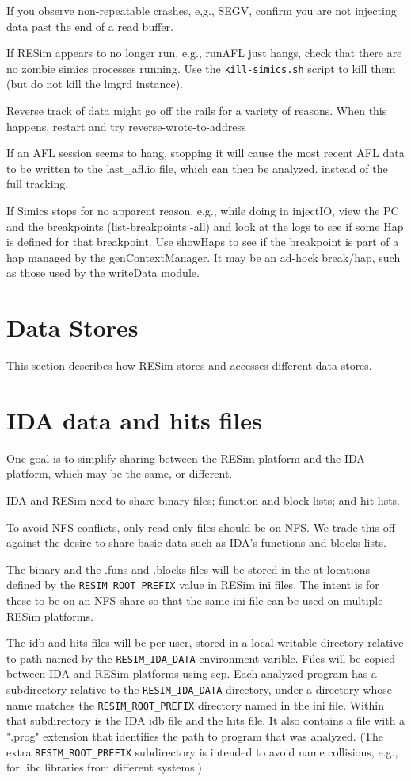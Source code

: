 \documentclass[titlepage]{article}
\begin{document}
If you observe non-repeatable crashes, e,g., SEGV, confirm you are not injecting data past the end of a read buffer.

If RESim appears to no longer run, e.g., runAFL just hangs, check that there are no zombie simics processes running.  Use
the {\tt kill-simics.sh} script to kill them (but do not kill the lmgrd instance).

Reverse track of data might go off the rails for a variety of reasons.  When this happens, restart and try reverse-wrote-to-address

If an AFL session seems to hang, stopping it will cause the most recent AFL data to be written to the last\_afl.io file, which can then
be analyzed.
instead of the full tracking.

If Simics stops for no apparent reason, e.g., while doing in injectIO, view the PC and the breakpoints (list-breakpoints -all)
and look at the logs to see if some Hap is defined for that breakpoint.  Use showHaps to see if the breakpoint is part of a hap
managed by the genContextManager.  It may be an ad-hock break/hap, such as those used by the writeData module.

\section{Data Stores}
This section describes how RESim stores and accesses different data stores.

\section{IDA data and hits files}
One goal is to simplify sharing between the RESim platform and the IDA platform,
which may be the same, or different.

IDA and RESim need to share binary files; function and block lists; and hit lists.

To avoid NFS conflicts, only read-only files should be on NFS. We trade this off against
the desire to share basic data such as IDA's functions and blocks lists.  

The binary and the .funs and .blocks files will be stored in the at locations defined
by the {\tt RESIM\_ROOT\_PREFIX} value in RESim ini files.  The intent is for these to
be on an NFS share so that the same ini file can be used on multiple RESim platforms.

The idb and hits files will be per-user, stored in a local writable directory relative to path 
named by the {\tt RESIM\_IDA\_DATA} environment varible.  Files will be copied between IDA
and RESim platforms using scp. Each analyzed program has a subdirectory relative to the {\tt RESIM\_IDA\_DATA}
directory, under a directory whose name matches the {\tt RESIM\_ROOT\_PREFIX} directory
named in the ini file.  Within that subdirectory is the IDA idb file and the hits file.  It also contains
a file with a ".prog" extension that identifies the path to program that was analyzed. 
(The extra {\tt RESIM\_ROOT\_PREFIX} subdirectory is intended to avoid name collisions, e.g., for libc libraries from
different systems.)
\end{document}
